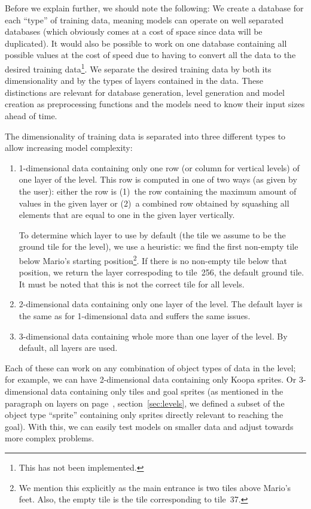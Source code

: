 Before we explain further, we should note the following: We create a
database for each ``type'' of training data, meaning models can
operate on well separated databases (which obviously comes at a cost
of space since data will be duplicated). It would also be possible to
work on one database containing all possible values at the cost of
speed due to having to convert all the data to the desired training
data\footnote{This has not been implemented.}. We separate the desired
training data by both its dimensionality and by the types of layers
contained in the data. These distinctions are relevant for database
generation, level generation and model creation as preprocessing
functions and the models need to know their input sizes ahead of time.

The dimensionality of training data is separated into three different
types to allow increasing model complexity:
\begin{enumerate}
\item 1-dimensional data containing only one row (or column for
  vertical levels) of one layer of the level. This row is computed in
  one of two ways (as given by the user): either the row is (1)~the
  row containing the maximum amount of values in the given layer or
  (2)~a combined row obtained by squashing all elements that are equal
  to one in the given layer vertically.

  To determine which layer to use by default (the tile we assume to be
  the ground tile for the level), we use a heuristic: we find the
  first non-empty tile below Mario's starting position\footnote{We
    mention this explicitly as the main entrance is two tiles above
    Mario's feet. Also, the empty tile is the tile corresponding to
    tile~37.}. If there is no non-empty tile below that position, we
  return the layer correspoding
  to tile~256, the default ground tile. \\
  It must be noted that this is not the correct tile for all levels.
\item 2-dimensional data containing only one layer of the level. The
  default layer is the same as for 1-dimensional data and suffers the
  same issues.
\item 3-dimensional data containing whole more than one layer of the
  level. By default, all layers are used.
\end{enumerate}

Each of these can work on any combination of object types of data in
the level; for example, we can have 2-dimensional data containing only
Koopa sprites. Or 3-dimensional data containing only tiles and goal
sprites (as mentioned in the paragraph on layers on
page~\pageref{par:layers}, section~\ref{sec:levels}, we defined a
subset of the object type ``sprite'' containing only sprites directly
relevant to reaching the goal). With this, we can easily test models
on smaller data and adjust towards more complex problems.

